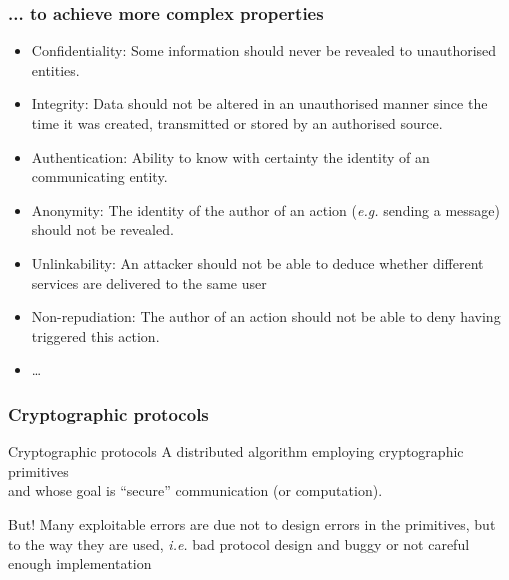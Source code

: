 \documentclass[aspectratio=169, lualatex,  10pt,dvipsnames,svgnames]{beamer} %
\def\enbleu#1{\textcolor{bleu}{#1}}
\begin{document}
\begin{frame}
  \frametitle{... to achieve more complex properties}
    \vspace{0.2cm}
    
  \begin{itemize}

  \item \enbleu{Confidentiality:} Some information should never be revealed to unauthorised entities.
    \vspace{0.2cm}

  \item \enbleu{Integrity}: Data should not be altered in an unauthorised manner since the time it was created, transmitted or stored by an authorised source.
    \vspace{0.2cm}

  \item \enbleu{Authentication:} Ability to know with certainty the identity of an communicating entity.
    \vspace{0.2cm}

  \item \enbleu{Anonymity:} The identity of the author of an action (\emph{e.g.} sending a message) should not be revealed.
    \vspace{0.2cm}

  \item \enbleu{Unlinkability:} An attacker should not be able to deduce whether different services are delivered to the same user
    \vspace{0.2cm}

  \item \enbleu{Non-repudiation:} The author of an action should not be able to deny having triggered this action.
    \vspace{0.2cm}

  \item \dots

  \end{itemize}
\end{frame}

\begin{frame}

  \frametitle{Cryptographic protocols}

  \begin{block}{Cryptographic protocols}
    A distributed algorithm employing \enbleu{cryptographic primitives} \\ \hfill and whose goal is \enbleu{``secure'' communication (or computation)}.
  \end{block}
  
  \vspace{0.5cm}
  \pause

  
  \begin{alertblock}{But!}
    Many exploitable errors are due not to design errors in the primitives, but to the way they are used, \emph{i.e.} bad protocol design and buggy or not careful enough implementation
  \end{alertblock}
  
\end{frame}
\end{document}
